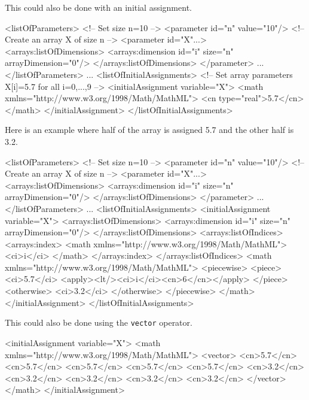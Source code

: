 This could also be done with an initial assignment.

\begin{example}
<listOfParameters> 
  <!-- Set size n=10 -->
  <parameter id="n" value="10"/>
  <!-- Create an array X of size n -->
  <parameter id="X"...>
    <arrays:listOfDimensions>
      <arrays:dimension id="i" size="n" arrayDimension="0"/> 
    </arrays:listOfDimensions>
  </parameter> ...
</listOfParameters> ...
<listOfInitialAssignments>
  <!-- Set array parameters X[i]=5.7 for all i=0,...,9 -->
  <initialAssignment variable="X">
    <math xmlns="http://www.w3.org/1998/Math/MathML">
      <cn type="real">5.7</cn>
    </math>
  </initialAssignment>
</listOfInitialAssignments>
\end{example}

Here is an example where half of the array is assigned 5.7 and the other half is 3.2. 

\begin{example}
<listOfParameters> 
 <!-- Set size n=10 -->
 <parameter id="n" value="10"/>
 <!-- Create an array X of size n -->
 <parameter id="X"...>
  <arrays:listOfDimensions>
   <arrays:dimension id="i" size="n" arrayDimension="0"/> 
  </arrays:listOfDimensions>
 </parameter> ...
</listOfParameters> ...
<listOfInitialAssignments>
 <initialAssignment variable="X"> 
  <arrays:listOfDimensions>
   <arrays:dimension id="i" size="n" arrayDimension="0"/>
  </arrays:listOfDimensions>
  <arrays:listOfIndices>
   <arrays:index>
    <math xmlns="http://www.w3.org/1998/Math/MathML">
      <ci>i</ci>
    </math>
   </arrays:index>
  </arrays:listOfIndices>
  <math xmlns="http://www.w3.org/1998/Math/MathML">
    <piecewise>
      <piece>
        <ci>5.7</ci>
        <apply><lt/><ci>i</ci><cn>6</cn></apply>
      </piece>
      <otherwise>
        <ci>3.2</ci>
      </otherwise>
    </piecewise>
  </math>
 </initialAssignment>
</listOfInitialAssignments>
\end{example}

This could also be done using the {\tt vector} operator.

\begin{example}
<initialAssignment variable="X"> 
 <math xmlns="http://www.w3.org/1998/Math/MathML">
  <vector> 
   <cn>5.7</cn> 
   <cn>5.7</cn> 
   <cn>5.7</cn> 
   <cn>5.7</cn> 
   <cn>5.7</cn> 
   <cn>3.2</cn> 
   <cn>3.2</cn> 
   <cn>3.2</cn> 
   <cn>3.2</cn> 
   <cn>3.2</cn>
  </vector>
 </math>
</initialAssignment>
\end{example}

